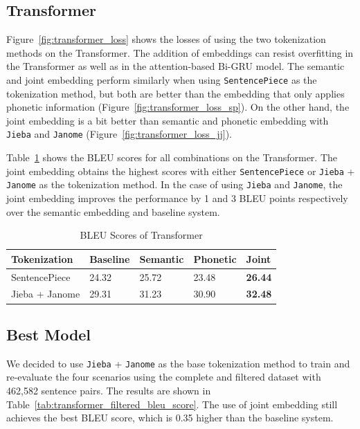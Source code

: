\subsection{Transformer}

Figure~\ref{fig:transformer_loss} shows the losses of using the two tokenization methods on the Transformer. The addition of embeddings can resist overfitting in the Transformer as well as in the attention-based Bi-GRU model. The semantic and joint embedding perform similarly when using \texttt{SentencePiece} as the tokenization method, but both are better than the embedding that only applies phonetic information (Figure~\ref{fig:transformer_loss_sp}). On the other hand, the joint embedding is a bit better than semantic and phonetic embedding with \texttt{Jieba} and \texttt{Janome} (Figure~\ref{fig:transformer_loss_jj}).

Table~\ref{tab:transformer_bleu_score} shows the BLEU scores for all combinations on the Transformer. The joint embedding obtains the highest scores with either \texttt{SentencePiece} or \texttt{Jieba} + \texttt{Janome} as the tokenization method. In the case of using \texttt{Jieba} and \texttt{Janome}, the joint embedding improves the performance by 1 and 3 BLEU points respectively over the semantic embedding and baseline system.

\vspace{0.5cm}
\begin{table}[h]
    \centering
    \begin{tabularx}{\textwidth}{bbbbb}\toprule
        Tokenization & Baseline & Semantic & Phonetic & Joint \\\midrule
        SentencePiece & 24.32 & 25.72 & 23.48 & \textbf{26.44} \\
        Jieba + Janome & 29.31 & 31.23 & 30.90 & \textbf{32.48} \\\bottomrule
    \end{tabularx}
    \caption{BLEU Scores of Transformer}
    \label{tab:transformer_bleu_score}
\end{table}

\subsection{Best Model}

We decided to use \texttt{Jieba} + \texttt{Janome} as the base tokenization method to train and re-evaluate the four scenarios using the complete and filtered dataset with 462,582 sentence pairs. The results are shown in Table~\ref{tab:transformer_filtered_bleu_score}. The use of joint embedding still achieves the best BLEU score, which is 0.35 higher than the baseline system.

